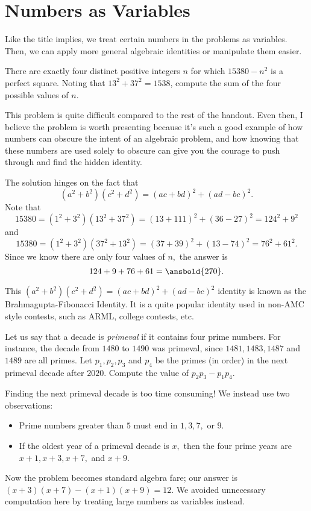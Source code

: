 \documentclass[mast]{lucky}
\begin{document}
\section{Numbers as Variables}
Like the title implies, we treat certain numbers in the problems as variables. Then, we can apply more general algebraic identities or manipulate them easier.
\begin{exam}[SMT 2021/N5]
There are exactly four distinct positive integers $n$ for which $15380 - n^2$ is a perfect square. Noting that $13^2 + 37^2 = 1538$, compute the sum of the four possible values of $n$.
\end{exam}

This problem is quite difficult compared to the rest of the handout. Even then, I believe the problem is worth presenting because it's such a good example of how numbers can obscure the intent of an algebraic problem, and how knowing that these numbers are used solely to obscure can give you the courage to push through and find the hidden identity.

\begin{sol}
The solution hinges on the fact that
\[(a^2+b^2)(c^2+d^2)=(ac+bd)^2+(ad-bc)^2.\]
Note that
\[15380=(1^2+3^2)(13^2+37^2)=(13+111)^2+(36-27)^2=124^2+9^2\]
and
\[15380=(1^2+3^2)(37^2+13^2)=(37+39)^2+(13-74)^2=76^2+61^2.\]
Since we know there are only four values of $n,$ the answer is
\[124+9+76+61=\ansbold{270}.\]
\end{sol}

This $(a^2+b^2)(c^2+d^2)=(ac+bd)^2+(ad-bc)^2$ identity is known as the Brahmagupta-Fibonacci Identity. It is a quite popular identity used in non-AMC style contests, such as ARML, college contests, etc.

\begin{exam}[2017-2018 Mandelbrot]
Let us say that a decade is \emph{primeval} if it contains four prime numbers. For instance, the decade from $1480$ to $1490$ was primeval, since $1481, 1483, 1487$ and $1489$ are all primes. Let $p_1,p _2, p_3$ and $p_4$ be the primes (in order) in the  next primeval decade after $2020.$ Compute the value of $p_2 p_3-p_1 p_4$.
\end{exam}

\begin{sol}
Finding the next primeval decade is too time consuming! We instead use two observations:
\begin{itemize}
\item Prime numbers greater than $5$ must end in $1,3,7,$ or $9.$
\item If the oldest year of a primeval decade is $x,$ then the four prime years are $x+1,x+3,x+7,$ and $x+9.$
\end{itemize}
Now the problem becomes standard algebra fare; our answer is $(x+3)(x+7)-(x+1)(x+9) = 12.$ We avoided unnecessary computation here by treating large numbers as variables instead.
\end{sol}
\end{document}
